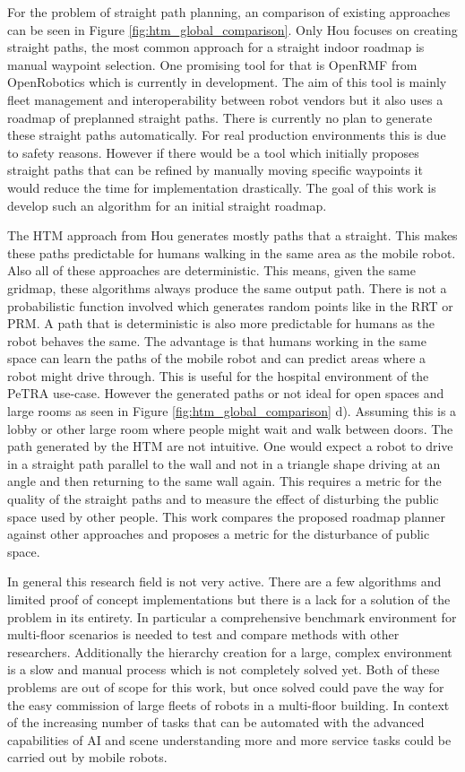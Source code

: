 For the problem of straight path planning, an comparison of existing approaches can be seen in Figure \ref{fig:htm_global_comparison}. Only Hou focuses on creating straight paths, the most common approach for a straight indoor roadmap is manual waypoint selection. One promising tool for that is OpenRMF from OpenRobotics \cite{openrobotics_open-rmf_2023} which is currently in development. The aim of this tool is mainly fleet management and interoperability between robot vendors but it also uses a roadmap of preplanned straight paths. There is currently no plan to generate these straight paths automatically. For real production environments this is due to safety reasons. However if there would be a tool which initially proposes straight paths that can be refined by manually moving specific waypoints it would reduce the time for implementation drastically. The goal of this work is develop such an algorithm for an initial straight roadmap.

The HTM approach from Hou generates mostly paths that a straight. This makes these paths predictable for humans walking in the same area as the mobile robot. Also all of these approaches are deterministic. This means, given the same gridmap, these algorithms always produce the same output path. There is not a probabilistic function involved which generates random points like in the RRT or PRM. A path that is deterministic is also more predictable for humans as the robot behaves the same. The advantage is that humans working in the same space can learn the paths of the mobile robot and can predict areas where a robot might drive through. This is useful for the hospital environment of the PeTRA use-case. However the generated paths or not ideal for open spaces and large rooms as seen in Figure \ref{fig:htm_global_comparison} d). Assuming this is a lobby or other large room where people might wait and walk between doors. The path generated by the HTM are not intuitive. One would expect a robot to drive in a straight path parallel to the wall and not in a triangle shape driving at an angle and then returning to the same wall again. This requires a metric for the quality of the straight paths and to measure the effect of disturbing the public space used by other people. This work compares the proposed roadmap planner against other approaches and proposes a metric for the disturbance of public space.

In general this research field is not very active. There are a few algorithms and limited proof of concept implementations but there is a lack for a solution of the problem in its entirety. In particular a comprehensive benchmark environment for multi-floor scenarios is needed to test and compare methods with other researchers. Additionally the hierarchy creation for a large, complex environment is a slow and manual process which is not completely solved yet. Both of these problems are out of scope for this work, but once solved could pave the way for the easy commission of large fleets of robots in a multi-floor building. In context of the increasing number of tasks that can be automated with the advanced capabilities of AI and scene understanding more and more service tasks could be carried out by mobile robots.